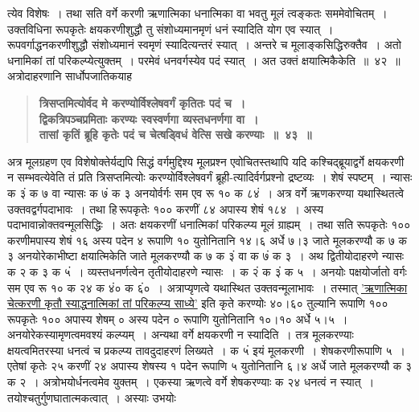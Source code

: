 \documentclass[11pt, openany]{book}
\begin{document}
\newpage

\begin{sloppypar}
\noindent त्येव विशेषः~। तथा सति वर्गे करणी ऋणात्मिका धनात्मिका वा भवतु मूलं त्वङ्कतः सममेवोचितम्~। उक्तविधिना रूपकृतेः क्षयकरणीशुद्धौ तु संशोध्यमानमृणं धनं स्यादिति योग एव स्यात्~। रूपवर्गाद्धनकरणीशुद्धौ संशोध्यमानं स्वमृणं स्यादित्यन्तरं स्यात्~। अन्तरे च मूलाङ्कसिद्धिरुक्तैव~। अतो धनामिकां तां परिकल्प्येत्युक्तम्~। परमेवं धनवर्गस्येव पदं स्यात्~। अत उक्तं क्षयात्मिकैकेति~॥~४२~॥\\

{\small अत्रोदाहरणानि सार्धोपजातिकयाह\textendash }

 \label{4.43}
\begin{quote}
{\large \textbf{{\color{purple}त्रिसप्तमित्योर्वद मे करण्योर्विश्लेषवर्गं कृतितः पदं च~।\\
द्विकत्रिपञ्चप्रमिताः करण्यः स्वस्वर्णगा व्यस्तधनर्णगा वा~।\\
तासां कृतिं ब्रूहि कृतेः पदं च चेत्षड्विधं वेत्सि सखे करण्याः~॥~४३~॥}}}
\end{quote}

अत्र मूलग्रहण एव विशेषोक्तेर्यद्यपि सिद्धं वर्गमुद्दिश्य मूलप्रश्न एवोचितस्तथापि यदि कश्चिद्ब्रूयाद्वर्गे क्षयकरणी न सम्भवत्येवेति तं प्रति त्रिसप्तमित्योः करण्योर्विश्लेषवर्गं ब्रूही-त्यादिर्वर्गप्रश्नो द्रष्टव्यः~। शेषं स्पष्टम्~। न्यासः क ३ं क ७ वा न्यासः क ७ं क ३ अनयोर्वर्गः सम एव रू १० क ८४ं~। अत्र वर्गे ऋणकरण्या यथास्थितत्वे उक्तवद्वर्गपदाभावः~। तथा हि\textendash \,रूपकृतेः १०० करणीं ८४ अपास्य शेषं १८४~। अस्य पदाभावान्नोक्तवन्मूलसिद्धिः~। अतः क्षयकरणीं धनात्मिकां परिकल्प्य मूलं ग्राह्यम्~। तथा सति रूपकृतेः १०० करणीमपास्य शेषं १६ अस्य पदेन ४ रूपाणि १० युतोनितानि १४।६ अर्धे ७।३ जाते मूलकरण्यौ क ७ क ३ अनयोरेकाभीष्टा क्षयात्मिकेति जाते मूलकरण्यौ क ७ क ३ं वा क ७ं क ३~। अथ द्वितीयोदाहरणे न्यासः क २ क ३ क ५ं~। व्यस्तधनर्णत्वेन तृतीयोदाहरणे न्यासः~। क २ं क ३ं क ५~। अनयोः पक्षयोर्जातो वर्गः सम एव रू १० क २४ क ४ं० क ६ं०~। अत्राप्यृणत्वे यथास्थित उक्तवन्मूलाभावः~। तस्मात् \hyperref[4.42]{'ऋणात्मिका चेत्करणी कृतौ स्याद्धनात्मिकां तां परिकल्प्य साध्ये'} इति कृते करण्योः ४०।६० तुल्यानि रूपाणि १०० रूपकृतेः १०० अपास्य शेषम् ० अस्य पदेन ० रूपाणि युतोनितानि १०।१० अर्धे ५।५~। अनयोरेकस्यामृणत्वमवश्यं कल्प्यम्~। अन्यथा वर्गे क्षयकरणी न स्यादिति~। तत्र मूलकरण्याः क्षयत्वमितरस्या धनत्वं च प्रकल्प्य तावदुदाहरणं लिख्यते~। क ५ं इयं मूलकरणी~। शेषकरणीरूपाणि ५~। एतेषां कृतेः २५ करणीं २४ अपास्य शेषस्य १ पदेन रूपाणि ५ युतोनितानि ६।४ अर्धे जाते मूलकरण्यौ क ३ क २~। अत्रोभयोर्धनत्वमेव युक्तम्~। एकस्या ऋणत्वे वर्गे शेषकरण्याः क २४ धनत्वं न स्यात्~। तयोश्चतुर्गुणघातात्मकत्वात्~। अस्याः उभयोः
\end{sloppypar}
\end{document}

